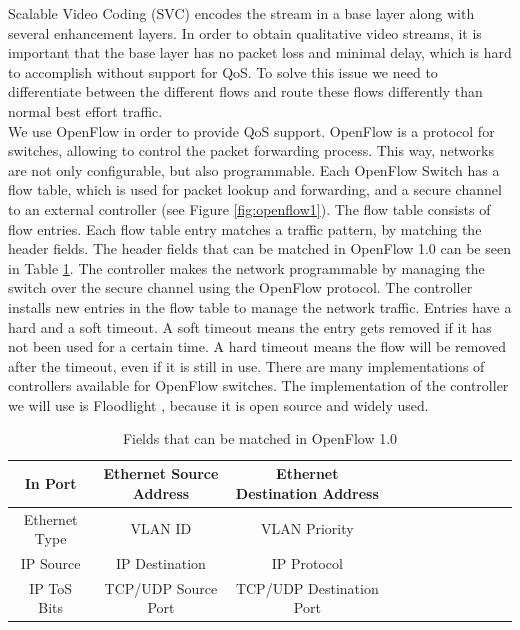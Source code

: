 \documentclass[conference]{IEEEtran}
\begin{document}
Scalable Video Coding (SVC) \cite{schwarz2007overview} encodes the stream in a base layer along with several enhancement layers. 
In order to obtain qualitative video streams, it is important that the base layer has no 
packet loss and minimal delay, which is hard to accomplish without support for QoS. 
To solve this issue we need to differentiate between the different flows and route these flows 
differently than normal best effort traffic.\\

We use OpenFlow \cite{mckeown2008openflow} in order to provide QoS support. 
OpenFlow is a protocol for switches, allowing to control the packet forwarding process.
This way, networks are not only configurable, but also programmable.
Each OpenFlow Switch has a flow table, which is used for packet lookup and 
forwarding, and a secure channel to an external controller (see Figure \ref{fig:openflow1}). 
The flow table consists of flow entries.
Each flow table entry matches a traffic pattern, by matching the header fields.
The header fields that can be matched in OpenFlow 1.0 can be seen in Table \ref{tab:matchedflows}.
The controller makes the network programmable by managing the switch over 
the secure channel using the OpenFlow protocol.
The controller installs new entries in the flow table to manage the network traffic.
Entries have a hard and a soft timeout. A soft timeout means the entry gets removed if it has not been used for a certain time.
A hard timeout means the flow will be removed after the timeout, even if it is still in use.
There are many implementations of controllers available for OpenFlow switches.
The implementation of the controller we will use is Floodlight \cite{floodlight}, because it is open source and widely used.

\begin{table}[htb]
\centering
\begin{tabular}{| c | *{11}{c|}}
\hline 
In Port & Ethernet Source Address & Ethernet Destination Address \\ \hline
Ethernet Type & VLAN ID & VLAN Priority \\ \hline
IP Source & IP Destination & IP Protocol \\ \hline
IP ToS Bits & TCP/UDP Source Port & TCP/UDP Destination Port\\ \hline 
\end{tabular}
\caption{Fields that can be matched in OpenFlow 1.0}
\label{tab:matchedflows}
\end{table}
\end{document}
